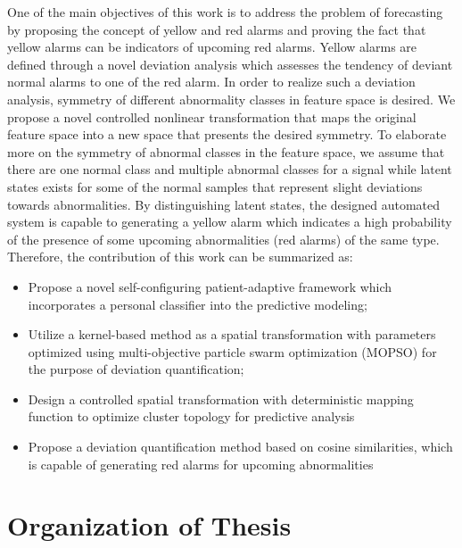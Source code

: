 One of the main objectives of this work is to address the problem of forecasting by proposing the concept of yellow and red alarms and proving the fact that yellow alarms can be indicators of upcoming red alarms. Yellow alarms are defined through a novel deviation analysis which assesses  the tendency of deviant normal alarms to one of the red alarm. In order to realize such a deviation analysis, symmetry of different abnormality classes in feature space is desired. We propose a novel controlled nonlinear transformation that maps the original feature space into a new space that presents the desired symmetry. %
To elaborate more on the symmetry of abnormal classes in the feature space, we assume that there are one normal class and multiple abnormal classes for a signal while latent states exists for some of the normal samples that represent slight deviations towards abnormalities.%
By distinguishing  latent states, the designed automated system is capable to generating a yellow alarm which indicates a high probability of the presence of some upcoming abnormalities (red alarms) of the same type. Therefore, the contribution of this work can be summarized as:

\begin{itemize}
    \item Propose a novel self-configuring patient-adaptive framework which incorporates a personal classifier into the predictive modeling;
    \item Utilize a kernel-based method as a spatial transformation with parameters optimized using multi-objective particle swarm optimization (MOPSO) for the purpose of deviation quantification;
    \item Design a controlled spatial transformation with deterministic mapping function to optimize cluster topology for predictive analysis
    \item Propose a deviation quantification method based on cosine similarities, which is capable of generating red alarms for upcoming abnormalities
\end{itemize}


\section{Organization of Thesis}

